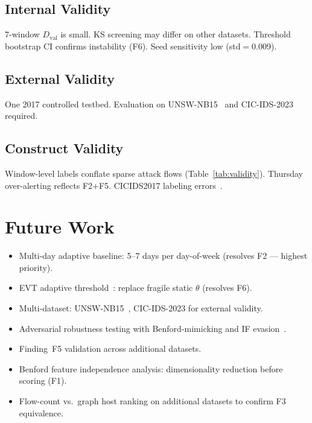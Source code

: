 \documentclass[journal,10pt,twoside]{IEEEtran}
\newcommand{\dval}{$D_{\mathrm{val}}$}
\begin{document}
\subsection{Internal Validity}
7-window \dval{} is small.  KS screening may differ on other
datasets.  Threshold bootstrap CI confirms instability (F6).
Seed sensitivity low (std$=$0.009).

\subsection{External Validity}
One 2017 controlled testbed.  Evaluation on
UNSW-NB15~\cite{moustafa2023unswnb15} and CIC-IDS-2023 required.

\subsection{Construct Validity}
Window-level labels conflate sparse attack flows
(Table~\ref{tab:validity}).  Thursday over-alerting reflects
F2+F5.  CICIDS2017 labeling errors~\cite{lanvin2024errors}.

\section{Future Work}
\label{sec:future}

\begin{itemize}
  \item Multi-day adaptive baseline: 5--7 days per day-of-week
    (resolves F2 --- highest priority).
  \item EVT adaptive threshold~\cite{siffer2017evt,zhao2023evt}:
    replace fragile static $\theta$ (resolves F6).
  \item Multi-dataset: UNSW-NB15~\cite{moustafa2023unswnb15},
    CIC-IDS-2023 for external validity.
  \item Adversarial robustness testing with Benford-mimicking and
    IF evasion~\cite{chen2023adversarial,ngo2023adversarial}.
  \item Finding~F5 validation across additional datasets.
  \item Benford feature independence analysis: dimensionality
    reduction before scoring (F1).
  \item Flow-count vs.\ graph host ranking on additional datasets
    to confirm F3 equivalence.
\end{itemize}

\end{document}
